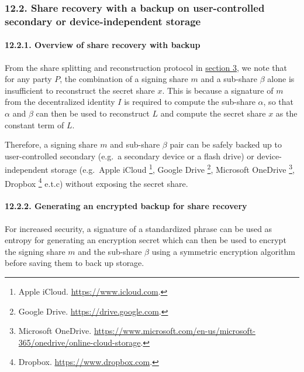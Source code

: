 \documentclass[
]{article}
\begin{document}
\hypertarget{share-recovery-backup}{%
\subsubsection{12.2. Share recovery with a backup on user-controlled
secondary or device-independent storage}\label{share-recovery-backup}}

\hypertarget{share-recovery-backup-overview}{%
\paragraph{12.2.1. Overview of share recovery with
backup}\label{share-recovery-backup-overview}}

From the share splitting and reconstruction protocol in
\protect\hyperlink{share-splitting-and-reconstruction}{section 3}, we
note that for any party \(P\), the combination of a signing share \(m\)
and a sub-share \(\beta\) alone is insufficient to reconstruct the
secret share \(x\). This is because a signature of \(m\) from the
decentralized identity \(I\) is required to compute the sub-share
\(\alpha\), so that \(\alpha\) and \(\beta\) can then be used to
reconstruct \(L\) and compute the secret share \(x\) as the constant
term of \(L\).

Therefore, a signing share \(m\) and sub-share \(\beta\) pair can be
safely backed up to user-controlled secondary (e.g.~a secondary device
or a flash drive) or device-independent storage (e.g.~Apple iCloud
\footnote{Apple iCloud. \url{https://www.icloud.com}.}, Google Drive
\footnote{Google Drive. \url{https://drive.google.com}.}, Microsoft
OneDrive \footnote{Microsoft OneDrive.
  \url{https://www.microsoft.com/en-us/microsoft-365/onedrive/online-cloud-storage}.},
Dropbox \footnote{Dropbox. \url{https://www.dropbox.com}.} e.t.c)
without exposing the secret share.

\hypertarget{share-recovery-backup-encrypt}{%
\paragraph{12.2.2. Generating an encrypted backup for share
recovery}\label{share-recovery-backup-encrypt}}

For increased security, a signature of a standardized phrase can be used
as entropy for generating an encryption secret which can then be used to
encrypt the signing share \(m\) and the sub-share \(\beta\) using a
symmetric encryption algorithm before saving them to back up storage.
\end{document}

